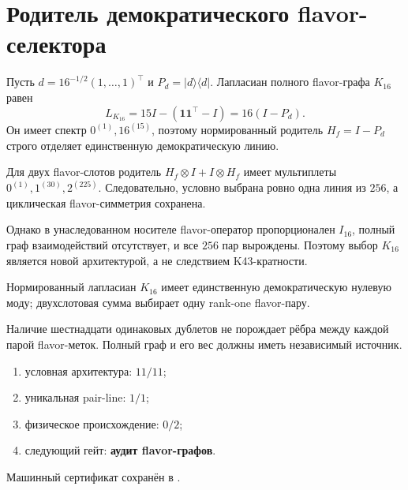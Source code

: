 \chapter{Родитель демократического flavor-селектора}
\label{ch:v10-discrete-resolution-democratic-flavor-parent}

Пусть $d=16^{-1/2}(1,\ldots,1)^\top$ и $P_d=|d\rangle\langle d|$.
Лапласиан полного flavor-графа $K_{16}$ равен
\begin{equation}
 L_{K_{16}}=15I-(\mathbf1\mathbf1^\top-I)=16(I-P_d).
\end{equation}
Он имеет спектр $0^{(1)},16^{(15)}$, поэтому нормированный родитель
$H_f=I-P_d$ строго отделяет единственную демократическую линию.

Для двух flavor-слотов родитель $H_f\otimes I+I\otimes H_f$ имеет
мультиплеты $0^{(1)},1^{(30)},2^{(225)}$. Следовательно, условно выбрана
ровно одна линия из $256$, а циклическая flavor-симметрия сохранена.

Однако в унаследованном носителе flavor-оператор пропорционален $I_{16}$,
полный граф взаимодействий отсутствует, и все $256$ пар вырождены. Поэтому
выбор $K_{16}$ является новой архитектурой, а не следствием K43-кратности.

\begin{theorem}
Нормированный лапласиан $K_{16}$ имеет единственную демократическую нулевую
моду; двухслотовая сумма выбирает одну rank-one flavor-пару.
\end{theorem}
\begin{nogocriterion}
Наличие шестнадцати одинаковых дублетов не порождает рёбра между каждой
парой flavor-меток. Полный граф и его вес должны иметь независимый источник.
\end{nogocriterion}
\begin{protocol}\begin{enumerate}
\item условная архитектура: \textbf{$11/11$};
\item уникальная pair-line: \textbf{$1/1$};
\item физическое происхождение: \textbf{$0/2$};
\item следующий гейт: \textbf{аудит flavor-графов}.
\end{enumerate}\end{protocol}
Машинный сертификат сохранён в
.